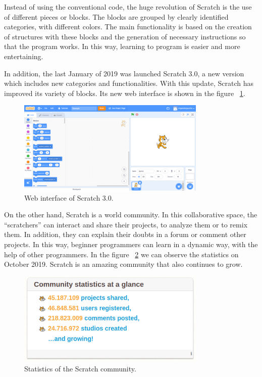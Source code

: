 Instead of using the conventional code, the huge revolution of Scratch is the use of different pieces or blocks. The blocks are grouped by clearly identified categories, with different colors. The main functionality is based on the creation of structures with these blocks and the generation of necessary instructions so that the program works. In this way, learning to program is easier and more entertaining.

In addition, the last January of 2019 was launched Scratch 3.0, a new version which includes new categories and functionalities. With this update, Scratch has improved its variety of blocks. Its new web interface is shown in the figure ~\ref{fig:scratch}.


\begin{figure}[h]
  \centering
  \includegraphics[width=9cm, keepaspectratio]{img/scratch.png}
  \caption{Web interface of Scratch 3.0.}
  \label{fig:scratch}
\end{figure}

On the other hand, Scratch is a world community. In this collaborative space, the ``scratchers'' can interact and share their projects, to analyze them or to remix them. In addition, they can explain their doubts in a forum or comment other projects. In this way, beginner programmers can learn in a dynamic way, with the help of other programmers. In the figure ~\ref{fig:statistics_scratch} we can observe the statistics on October 2019. Scratch is an amazing community that also continues to grow. 

\begin{figure}[h]
  \centering
  \includegraphics[width=9cm, keepaspectratio]{img/statistics_scratch.png}
  \caption{Statistics of the Scratch community.}
  \label{fig:statistics_scratch}
\end{figure}



